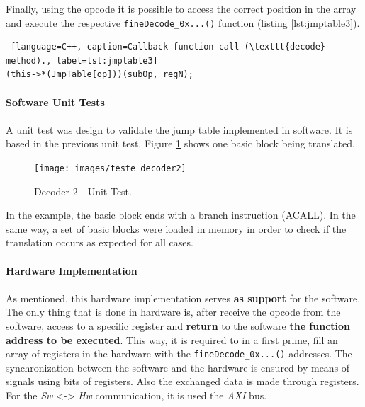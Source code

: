 Finally, using the opcode it is possible to access the correct position in the array and execute the respective \texttt{fineDecode\_0x...()} function (listing \ref{lst:jmptable3}).

\begin{lstlisting} [language=C++, caption=Callback function call (\texttt{decode} method)., label=lst:jmptable3]
(this->*(JmpTable[op]))(subOp, regN);
\end{lstlisting}

\paragraph{Software Unit Tests}

\paragraph{}

A unit test was design to validate the jump table implemented in software. It is based in the previous unit test. Figure \ref{fig:teste1_decoder2} shows one basic block being translated.

\begin{figure}[H]
\centerline{
\texttt{[image: images/teste\_decoder2]}
}
\caption{Decoder 2 - Unit Test.}
\label{fig:teste1_decoder2} 
\end{figure}

In the example, the basic block ends with a branch instruction (ACALL). In the same way, a set of basic blocks were loaded in memory in order to check if the translation occurs as expected for all cases. 

\paragraph{Hardware Implementation}

\paragraph{}

As mentioned, this hardware implementation serves \textbf{as support} for the software. The only thing that is done in hardware is, after receive the opcode from the software, access to a specific register and \textbf{return} to the software \textbf{the function address to be executed}. This way, it is required to in a first prime, fill an array of registers in the hardware with the \texttt{fineDecode\_0x...()} addresses. The synchronization between the software and the hardware is ensured by means of signals using bits of registers. Also the exchanged data is made through registers. For the \textit{Sw} <-> \textit{Hw} communication, it is used the \textit{AXI} bus.

